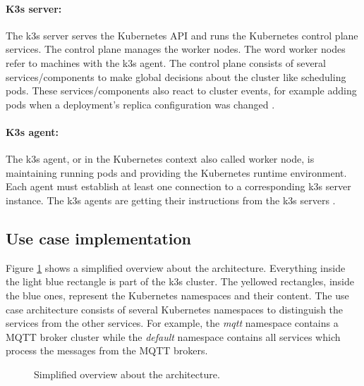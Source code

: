 \paragraph{K3s server:} The k3s server serves the Kubernetes API and runs the Kubernetes control plane services. The control plane manages the worker nodes. The word worker nodes refer to machines with the k3s agent. The control plane consists of several services/components to make global decisions about the cluster like scheduling pods. These services/components also react to cluster events, for example adding pods when a deployment’s replica configuration was changed \cite{Rancher} \cite{kubernetes-components}.

\paragraph{K3s agent:} The k3s agent, or in the Kubernetes context also called worker node, is maintaining running pods and providing the Kubernetes runtime environment. Each agent must establish at least one connection to a corresponding k3s server instance. The k3s agents are getting their instructions from the k3s servers \cite{Rancher} \cite{kubernetes-components}.

\subsection{Use case implementation}
Figure \ref{fig:k3s-arch-overview} shows a simplified overview about the architecture. Everything inside the light blue rectangle is part of the k3s cluster. The yellowed rectangles, inside the blue ones, represent the Kubernetes namespaces and their content. The use case architecture consists of several Kubernetes namespaces to distinguish the services from the other services. For example, the \textit{mqtt} namespace contains a MQTT broker cluster while the \textit{default} namespace contains all services which process the messages from the MQTT brokers.

\newpage
\begin{figure}[H]
    \centering
    \fontsize{8}{10}\selectfont
    \def\svgwidth{\textwidth}
    
    \caption{Simplified overview about the architecture.}
    \label{fig:k3s-arch-overview}
\end{figure}
\newpage


